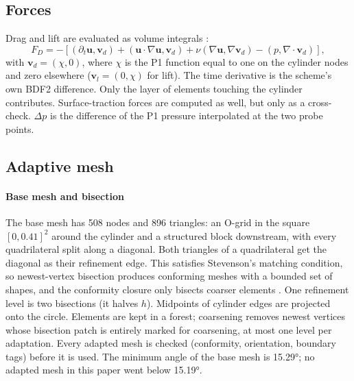 \documentclass[preprint,12pt,number]{elsarticle}
\newcommand{\bu}{\mathbf{u}}
\newcommand{\bv}{\mathbf{v}}
\begin{document}
\subsection{Forces}

Drag and lift are evaluated as volume integrals \citep{johnmatthies2001,john2004}:
\begin{equation}
F_D = -\left[(\partial_t\bu, \bv_d) + (\bu\cdot\nabla\bu, \bv_d) + \nu(\nabla\bu, \nabla\bv_d)
- (p, \nabla\cdot\bv_d)\right],
\end{equation}
with $\bv_d = (\chi, 0)$, where $\chi$ is the P1 function equal to one on the cylinder nodes
and zero elsewhere ($\bv_l = (0, \chi)$ for lift). The time derivative is the scheme's own
BDF2 difference. Only the layer of elements touching the cylinder contributes. Surface-traction
forces are computed as well, but only as a cross-check. $\Delta p$ is the difference of the
P1 pressure interpolated at the two probe points.

\subsection{Adaptive mesh}
\label{sec:amr}

\paragraph{Base mesh and bisection}
The base mesh has 508 nodes and 896 triangles: an O-grid in the square
$[0, 0.41]^2$ around the cylinder and a structured block downstream, with every quadrilateral
split along a diagonal. Both triangles of a quadrilateral get the diagonal as their refinement
edge. This satisfies Stevenson's matching condition, so newest-vertex bisection produces
conforming meshes with a bounded set of shapes, and the conformity closure only bisects
coarser elements \citep{mitchell1989,binev2004,stevenson2008}. One refinement level is two bisections
(it halves $h$). Midpoints of cylinder edges are projected onto the circle. Elements are kept
in a forest; coarsening removes newest vertices whose bisection patch is entirely marked for
coarsening, at most one level per adaptation. Every adapted mesh is checked (conformity,
orientation, boundary tags) before it is used. The minimum angle of the base mesh is
\ang{15.29}; no adapted mesh in this paper went below \ang{15.19}.
\end{document}
